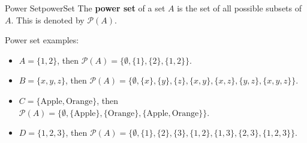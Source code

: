 \begin{definition}{Power Set}{powerSet}
  The \textbf{power set} of a set \( A \) is the set of all possible subsets of \( A \).
  This is denoted by \( \mathcal{P}(A) \).
\end{definition}

Power set examples:
\begin{itemize}
  \item \( A = \{ 1, 2 \} \), then \( \mathcal{P}(A) = \{ \emptyset, \{ 1 \}, \{ 2 \}, \{ 1, 2 \} \} \).
  \item \( B = \{ x, y, z \} \), then \( \mathcal{P}(A) = \{ \emptyset, \{ x \}, \{ y \}, \{ z \},
  \{ x, y \}, \{ x, z \}, \{ y, z \}, \{ x, y, z \} \} \).
  \item \( C = \{ \text{Apple}, \text{Orange} \} \), then \( \mathcal{P}(A) = \{ \emptyset,
  \{ \text{Apple} \}, \{ \text{Orange} \}, \{ \text{Apple}, \text{Orange} \} \} \).
  \item \( D = \{ 1, 2, 3 \} \), then \( \mathcal{P}(A) = \{ \emptyset, \{ 1 \}, \{ 2 \},
  \{ 3 \}, \{ 1, 2 \}, \{ 1, 3 \}, \{ 2, 3 \}, \{ 1, 2, 3 \} \} \).
\end{itemize}
